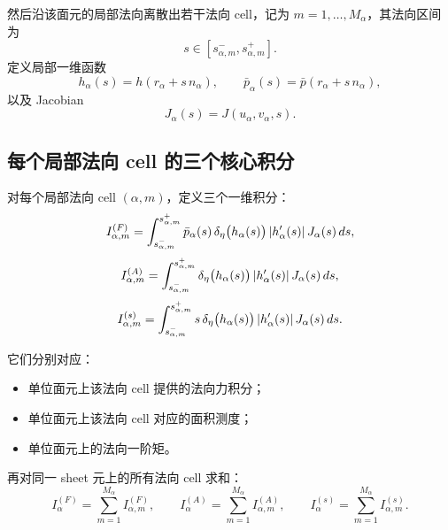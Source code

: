 \documentclass[12pt,a4paper]{ctexart}
\begin{document}
然后沿该面元的局部法向离散出若干法向 cell，记为 $m=1,\dots,M_\alpha$，其法向区间为
\begin{equation}
    s\in[s^-_{\alpha,m},s^+_{\alpha,m}].
\end{equation}
定义局部一维函数
\begin{equation}
    h_\alpha(s)=h(r_\alpha+s\,n_\alpha),\qquad
    \bar p_\alpha(s)=\bar p(r_\alpha+s\,n_\alpha),
\end{equation}
以及 Jacobian
\begin{equation}
    J_\alpha(s)=J(u_\alpha,v_\alpha,s).
\end{equation}

\subsection{每个局部法向 cell 的三个核心积分}

对每个局部法向 cell $(\alpha,m)$，定义三个一维积分：
\begin{equation}
    I_{\alpha,m}^{(F)}=
    \int_{s^-_{\alpha,m}}^{s^+_{\alpha,m}}
    \bar p_\alpha(s)\,
    \delta_\eta\bigl(h_\alpha(s)\bigr)\,
    \abs{h_\alpha'(s)}\,
    J_\alpha(s)\,ds,
\end{equation}
\begin{equation}
    I_{\alpha,m}^{(A)}=
    \int_{s^-_{\alpha,m}}^{s^+_{\alpha,m}}
    \delta_\eta\bigl(h_\alpha(s)\bigr)\,
    \abs{h_\alpha'(s)}\,
    J_\alpha(s)\,ds,
\end{equation}
\begin{equation}
    I_{\alpha,m}^{(s)}=
    \int_{s^-_{\alpha,m}}^{s^+_{\alpha,m}}
    s\,
    \delta_\eta\bigl(h_\alpha(s)\bigr)\,
    \abs{h_\alpha'(s)}\,
    J_\alpha(s)\,ds.
\end{equation}

它们分别对应：
\begin{itemize}
    \item 单位面元上该法向 cell 提供的法向力积分；
    \item 单位面元上该法向 cell 对应的面积测度；
    \item 单位面元上的法向一阶矩。
\end{itemize}

再对同一 sheet 元上的所有法向 cell 求和：
\begin{equation}
    I_{\alpha}^{(F)}=\sum_{m=1}^{M_\alpha}I_{\alpha,m}^{(F)},\qquad
    I_{\alpha}^{(A)}=\sum_{m=1}^{M_\alpha}I_{\alpha,m}^{(A)},\qquad
    I_{\alpha}^{(s)}=\sum_{m=1}^{M_\alpha}I_{\alpha,m}^{(s)}.
\end{equation}
\end{document}
